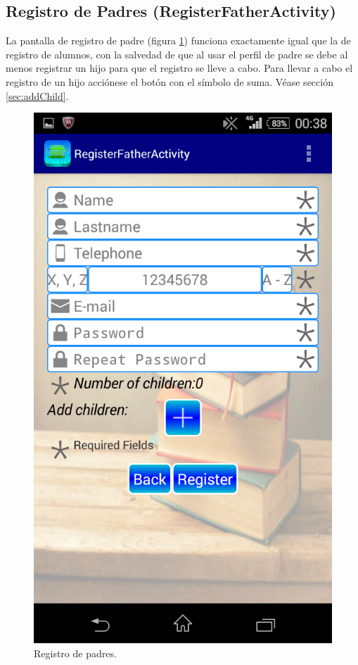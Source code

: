 		\subsection{Registro de Padres (RegisterFatherActivity)} \label{sec:FatherRegister}
		
			La pantalla de registro de padre (figura \ref{fig:fatherRegister}) funciona exactamente igual que la de registro de alumnos, con la salvedad de que al usar el perfil de padre se debe al menos registrar un hijo para que el registro se lleve a cabo. Para llevar a cabo el registro de un hijo acciónese el botón con el símbolo de suma. Véase sección \ref{sec:addChild}.
			
			\begin{figure}[h !]
				\centering
				\includegraphics[scale=0.2]{Imagenes/App/registroPadre}
				\caption{Registro de padres.}
				\label{fig:fatherRegister}
			\end{figure}
			
